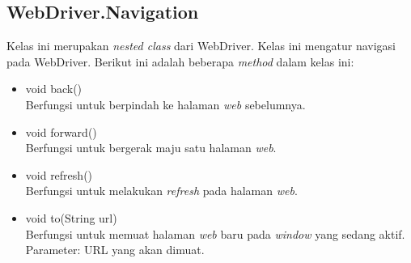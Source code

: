\subsection{WebDriver.Navigation}
\label{subsec:webdriver_navigation}
Kelas ini merupakan \textit{nested class} dari WebDriver. Kelas ini mengatur navigasi pada WebDriver. Berikut ini adalah beberapa \textit{method} dalam kelas ini:
\begin{itemize}
\item void back()\\
Berfungsi untuk berpindah ke halaman \textit{web} sebelumnya.
\item void forward()\\
Berfungsi untuk bergerak maju satu halaman \textit{web}. 
\item void refresh()\\
Berfungsi untuk melakukan \textit{refresh} pada halaman \textit{web}.
\item void to(String url)\\
Berfungsi untuk memuat halaman \textit{web} baru pada \textit{window} yang sedang aktif.\\
Parameter: URL yang akan dimuat.
\end{itemize}

